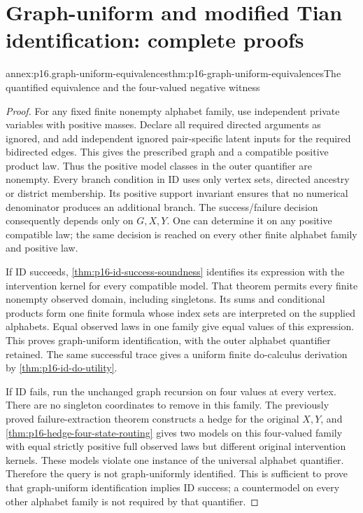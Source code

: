 \section{Graph-uniform and modified Tian identification: complete proofs}
\label{sec:annex-p16-graph-uniform-identification}

\begin{annexitem}{annex:p16.graph-uniform-equivalences}{thm:p16-graph-uniform-equivalences}{The quantified equivalence and the four-valued negative witness}
\begin{proof}
For any fixed finite nonempty alphabet family, use independent private
variables with positive masses. Declare all required directed arguments
as ignored, and add independent ignored pair-specific latent inputs
for the required bidirected edges. This gives the prescribed graph
and a compatible positive product law. Thus the positive model classes in the outer quantifier are
nonempty. Every branch condition in ID uses only vertex sets,
directed ancestry or district membership. Its positive support invariant
ensures that no numerical denominator produces an additional branch.
The success/failure decision consequently depends only on \(G,X,Y\).
One can determine it on any positive compatible law; the same decision
is reached on every other finite alphabet family and positive law.

If ID succeeds, \cref{thm:p16-id-success-soundness} identifies its
expression with the intervention kernel for every compatible model.
That theorem permits every finite nonempty observed domain, including
singletons. Its sums and conditional products form one finite formula
whose index sets are interpreted on the supplied alphabets. Equal
observed laws in one family give equal values of this expression.
This proves graph-uniform identification, with the outer alphabet
quantifier retained. The same successful trace gives a uniform finite
do-calculus derivation by \cref{thm:p16-id-do-utility}.

If ID fails, run the unchanged graph recursion on four values at
every vertex. There are no singleton coordinates to remove in this
family. The previously proved failure-extraction theorem constructs
a hedge for the original \(X,Y\), and
\cref{thm:p16-hedge-four-state-routing} gives two models on this
four-valued family with equal strictly positive full observed laws
but different original intervention kernels. These models violate
one instance of the universal alphabet quantifier. Therefore the
query is not graph-uniformly identified. This is sufficient to prove
that graph-uniform identification implies ID success; a countermodel
on every other alphabet family is not required by that quantifier.


\end{proof}
\end{annexitem}
